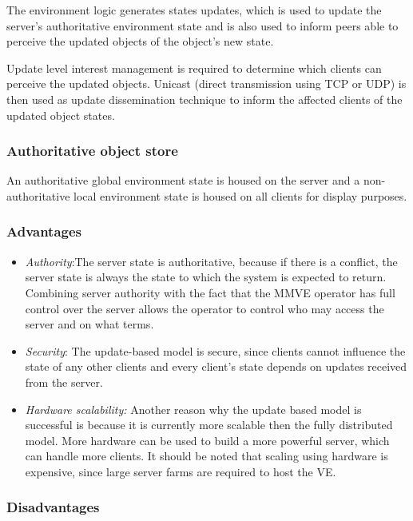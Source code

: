 The environment logic generates states updates, which is used to update the server's authoritative environment state and is also used to inform peers able to perceive the updated objects of the object's new state.

Update level interest management is required to determine which clients can perceive the updated objects. Unicast (direct transmission using TCP or UDP) is then used as update dissemination technique to inform the affected clients of the updated object states.

\subsubsection{Authoritative object store}
An authoritative global environment state is housed on the server and a  non-authoritative local environment state is housed on all clients for display purposes.

\subsubsection{Advantages}

\begin{itemize}
\item \emph{Authority}:The server state is authoritative, because if there is a conflict, the server state is always the state to which the system is expected to return. Combining server authority with the fact that the MMVE operator has full control over the server allows the operator to control who may access the server and on what terms.

\item \emph{Security}: The update-based model is secure, since clients cannot influence the state of any other clients and every client's state depends on updates received from the server.

\item \emph{Hardware scalability:} Another reason why the update based model is successful is because it is currently more scalable then the fully distributed model. More hardware can be used to build a more powerful server, which can handle more clients. It should be noted that scaling using hardware is expensive, since large server farms are required to host the VE.
\end{itemize}

\subsubsection{Disadvantages}


